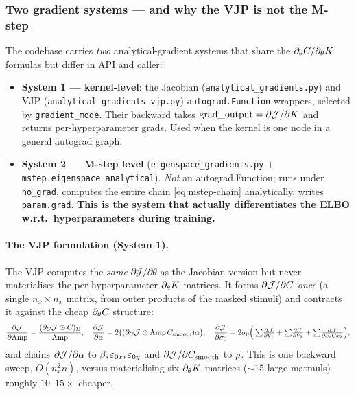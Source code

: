 \subsubsection{Two gradient systems --- and why the VJP is not the M-step}

The codebase carries \emph{two} analytical-gradient systems that share the
$\partial_\theta C/\partial_\theta K$ formulas but differ in API and caller:
\begin{itemize}[leftmargin=1.4em,itemsep=1pt]
  \item \textbf{System 1 --- kernel-level}: the Jacobian
        (\texttt{analytical\_\allowbreak gradients.py}) and VJP
        (\texttt{analytical\_\allowbreak gradients\_\allowbreak vjp.py})
        \texttt{autograd.Function} wrappers, selected by
        \texttt{gradient\_mode}. Their backward takes $\mathrm{grad\_output}=
        \partial\mathcal{J}/\partial K$ and returns per-hyperparameter grads.
        Used when the kernel is one node in a general autograd graph.
  \item \textbf{System 2 --- M-step level} (\texttt{eigenspace\_gradients.py} $+$
        \texttt{mstep\_eigenspace\_analytical}). \emph{Not} an autograd.Function;
        runs under \texttt{no\_grad}, computes the entire chain \eqref{eq:mstep-chain}
        analytically, writes \texttt{param.grad}. \textbf{This is the system that
        actually differentiates the ELBO w.r.t.\ hyperparameters during training.}
\end{itemize}

\paragraph{The VJP formulation (System 1).}
The VJP computes the \emph{same} $\partial\mathcal{J}/\partial\theta$ as the
Jacobian version but never materialises the per-hyperparameter
$\partial_\theta K$ matrices. It forms $\partial\mathcal{J}/\partial C$
\emph{once} (a single $n_x\times n_x$ matrix, from outer products of the masked
stimuli) and contracts it against the cheap $\partial_\theta C$ structure:
\begin{equation}
\frac{\partial\mathcal{J}}{\partial\mathrm{Amp}}=\frac{(\partial_{C}\mathcal{J}\odot C)_{\Sigma}}{\mathrm{Amp}},\quad
\frac{\partial\mathcal{J}}{\partial\alpha}=2\big((\partial_{C}\mathcal{J}\odot\mathrm{Amp}\,C_{\mathrm{smooth}})\alpha\big),\quad
\frac{\partial\mathcal{J}}{\partial\sigma_{0}}=2\sigma_{0}\Big(\textstyle\sum\!\tfrac{\partial\mathcal{J}}{\partial V_1}+\sum\!\tfrac{\partial\mathcal{J}}{\partial V_2}+\sum\!\tfrac{\partial\mathcal{J}}{\partial x_1C x_2}\Big),
\end{equation}
and chains $\partial\mathcal{J}/\partial\alpha$ to $\beta,\varepsilon_{0x},
\varepsilon_{0y}$ and $\partial\mathcal{J}/\partial C_{\mathrm{smooth}}$ to $\rho$. This is one
backward sweep, $O(n_x^2 n)$, versus materialising six $\partial_\theta K$
matrices ($\sim\!15$ large matmuls) --- roughly $10\text{--}15\times$ cheaper.

